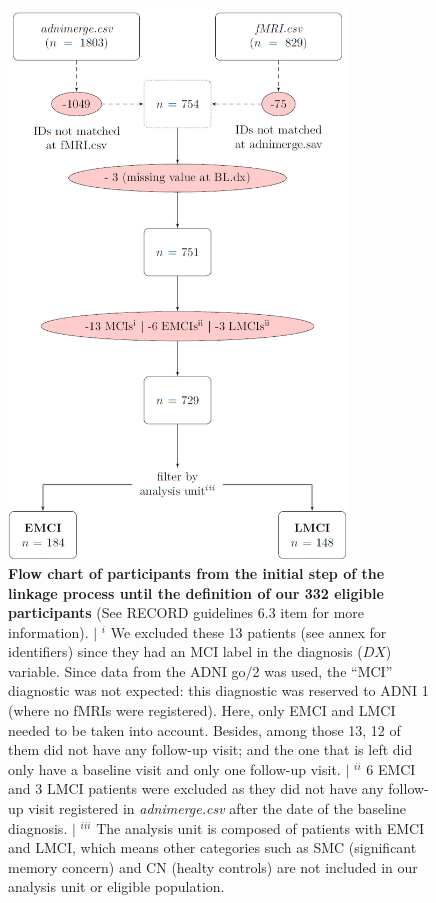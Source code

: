 \documentclass[a4paper,12pt]{elsarticle}  %
\begin{document}
	\thispagestyle{empty} %
	\begin{figure}[]

		\centering	
		\includegraphics[width=0.8\textwidth]{fig_inclusion_datalinkage.png}	
		\caption{\textbf{Flow chart of participants from the initial step of the linkage process until the definition of our 332 eligible participants} (See RECORD guidelines 6.3 item for more information).\cite{Benchimol2015} $|$ $^i$ We excluded these 13 patients (see annex for identifiers) since they had an MCI label in the diagnosis ($DX$) variable. Since data from the ADNI go$/$2 was used, the ``MCI'' diagnostic was not expected: this diagnostic was reserved to ADNI 1 (where no fMRIs were registered). Here, only EMCI and LMCI needed to be taken into account. Besides, among those 13, 12 of them did not have any follow-up visit; and the one that is left did only have a baseline visit and only one follow-up visit.  $|$ $^{ii}$ 6 EMCI and 3 LMCI patients were excluded as they did not have any follow-up visit registered in \textit{adnimerge.csv} after the date of the baseline diagnosis. $|$ $^{iii}$ The analysis unit is composed of patients with EMCI and LMCI, which means other categories such as SMC (significant memory concern) and CN (healty controls) are not included in our analysis unit or eligible population.}

		\label{fig:data_linkage}
	\end{figure}
	\FloatBarrier	 
\end{document}
